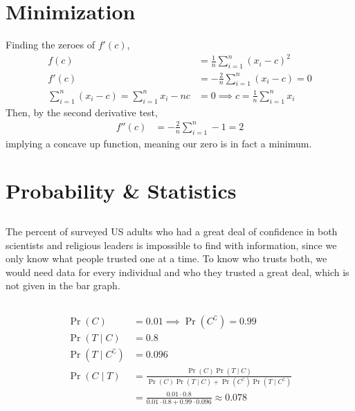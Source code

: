 \documentclass{article}
\begin{document}
\section{Minimization}

Finding the zeroes of \(f'(c)\),
\begin{align}
    f(c) &= \frac{1}{n} \sum_{i = 1}^n (x_i - c)^2 \\
    f'(c) &= -\frac{2}{n} \sum_{i = 1}^n (x_i - c) = 0 \\
    \sum_{i = 1}^n (x_i - c) = \sum_{i = 1}^n x_i - nc &= 0 \implies c = \frac{1}{n} \sum_{i = 1}^n x_i
\end{align}
Then, by the second derivative test,
\begin{align}
    f''(c) &= -\frac{2}{n} \sum_{i = 1}^n -1 = 2
\end{align}
implying a concave up function, meaning our zero is in fact a minimum.

\section{Probability \& Statistics}

\subsection{}

The percent of surveyed US adults who had a great deal of confidence in both scientists and religious leaders is impossible to find with information, since we only know what people trusted one at a time.
To know who trusts both, we would need data for every individual and who they trusted a great deal, which is not given in the bar graph.

\subsection{}

\begin{align}
    \Pr(C) &= 0.01 \implies \Pr(C^\complement) = 0.99 \\
    \Pr(T \mid C) &= 0.8 \\
    \Pr(T \mid C^\complement) &= 0.096 \\
    \Pr(C \mid T) &= \frac{\Pr(C) \Pr(T \mid C)}{\Pr(C) \Pr(T \mid C) + \Pr(C^\complement) \Pr(T \mid C^\complement)} \\
    &= \frac{0.01 \cdot 0.8}{0.01 \cdot 0.8 + 0.99 \cdot 0.096} \approx 0.078
\end{align}
\end{document}
